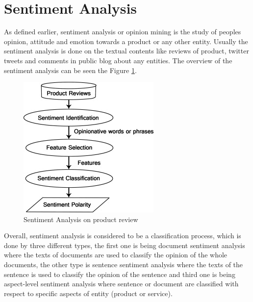 \documentclass[sigconf]{acmart}
\begin{document}
\section{Sentiment Analysis}
As defined earlier, sentiment analysis or opinion mining is the study of peoples opinion, attitude and emotion towards a product or any other entity. Usually the sentiment analysis is done on the textual contents like reviews of product, twitter tweets and comments in public blog about any entities. The overview of the sentiment analysis can be seen the Figure \ref{f:SA}.

\begin{figure}[!ht]
  \centering\includegraphics[width=\columnwidth]{images/sa.jpg}
  \caption{Sentiment Analysis on product review \cite{sentianalysis}}\label{f:SA}
\end{figure}

Overall, sentiment analysis is considered to be a classification process, which is done by three different types, the first one is being document sentiment analysis where the texts of documents are used to classify the opinion of the whole documents, the other type is sentence sentiment analysis where the texts of the sentence is used to classify the opinion of the sentence and third one is being aspect-level sentiment analysis where sentence or document are classified with respect to specific aspects of entity (product or service). 
\end{document}
